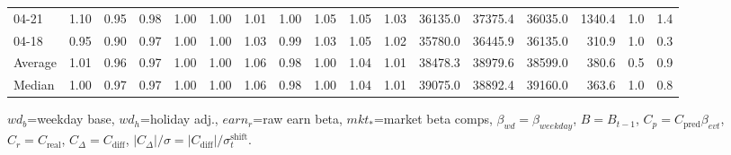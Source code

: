 \begin{threeparttable}
{\begin{tabular}{lrrrrrrrrrrrrrrrr}
  04-21 &   1.10 &   0.95 &         0.98 &     1.00 &           1.00 &        1.01 &        1.00 &        1.05 &          1.05 &          1.03 & 36135.0 & 37375.4 & 36035.0 &     1340.4 &                      1.0 &                 1.4 \\
  04-18 &   0.95 &   0.90 &         0.97 &     1.00 &           1.00 &        1.03 &        0.99 &        1.03 &          1.05 &          1.02 & 35780.0 & 36445.9 & 36135.0 &      310.9 &                      1.0 &                 0.3 \\
Average &   1.01 &   0.96 &         0.97 &     1.00 &           1.00 &        1.06 &        0.98 &        1.00 &          1.04 &          1.01 & 38478.3 & 38979.6 & 38599.0 &      380.6 &                      0.5 &                 0.9 \\
 Median &   1.00 &   0.97 &         0.97 &     1.00 &           1.00 &        1.06 &        0.98 &        1.00 &          1.04 &          1.01 & 39075.0 & 38892.4 & 39160.0 &      363.6 &                      1.0 &                 0.8 \\
\bottomrule
\end{tabular}
}
\begin{tablenotes}\footnotesize
\item $wd_b$=weekday base, $wd_h$=holiday adj.,
$earn_r$=raw earn beta, $mkt_{*}$=market beta comps,
$\beta_{wd}=\beta_{weekday}$, $B=B_{t-1}$,
$C_p=C_{\text{pred}}\beta_{evt}$, $C_r=C_{\text{real}}$,
$C_\Delta=C_{\text{diff}}$, $|C_\Delta|/\sigma=|C_{\text{diff}}|/\sigma_t^{\text{shift}}$.
\end{tablenotes}
\end{threeparttable}
\endgroup
